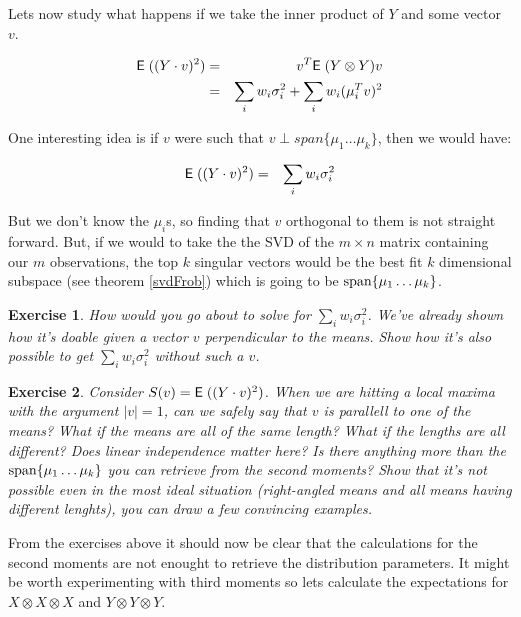 \documentclass{book}
\newtheorem{exercise}{Exercise}
\numberwithin{exercise}{chapter}
\begin{document}
Lets now study what happens if we take the inner product of $Y$ and some
vector $v$.

\begin{eqnarray*}
  \hbox{{\sf E}\;}( (Y \cdot v)^2 )
  &=& v^T \hbox{{\sf E}\;}(Y \otimes Y) v \\
  &=& \sum_i w_i \sigma_i^2 + \sum_i w_i (\mu_i^T v)^2
\end{eqnarray*}

One interesting idea is if $v$ were such that $v \perp span\{\mu_1 \dots
\mu_k\}$, then we would have:

\begin{eqnarray*}
  \hbox{{\sf E}\;}( (Y \cdot v)^2 )
  &=& \sum_i w_i \sigma_i^2
\end{eqnarray*}

But we don't know the $\mu_i$s, so finding that $v$ orthogonal to them
is not straight forward. But, if we would to take the the SVD of the $m
\times n$ matrix containing our $m$ observations, the top $k$ singular
vectors would be the best fit $k$ dimensional subspace (see theorem
\ref{svdFrob}) which is going to be $\hbox{span}\{\mu_1 \dots \mu_k\}$.

\begin{exercise}\label{ex:svd-gives-sigma}
  How would you go about to solve for $\sum_i w_i \sigma_i^2$. We've
  already shown how it's doable given a vector $v$ perpendicular to the
  means.  Show how it's also possible to get $\sum_i w_i \sigma_i^2$ without such a $v$.
\end{exercise}

\begin{exercise}
  Consider $S(v) = \hbox{{\sf E}\;}( (Y \cdot v)^2 )$. When we are hitting a local
  maxima with the argument $|v| = 1$, can we safely say that $v$ is
  parallell to one of the means? What if the means are all of the same
  length? What if the lengths are all different? Does linear
  independence matter here? Is there anything more than the
  $\hbox{span}\{\mu_1 \dots \mu_k\}$ you can retrieve from the second moments?
  Show that it's not possible even in the most ideal situation
  (right-angled means and all means having different lenghts), you can
  draw a few convincing examples.
\end{exercise}

From the exercises above it should now be clear that the calculations
for the second moments are not enought to retrieve the distribution
parameters. It might be worth experimenting with third moments so lets
calculate the expectations for $X \otimes X \otimes X$ and
$Y \otimes Y \otimes Y$.
\end{document}
